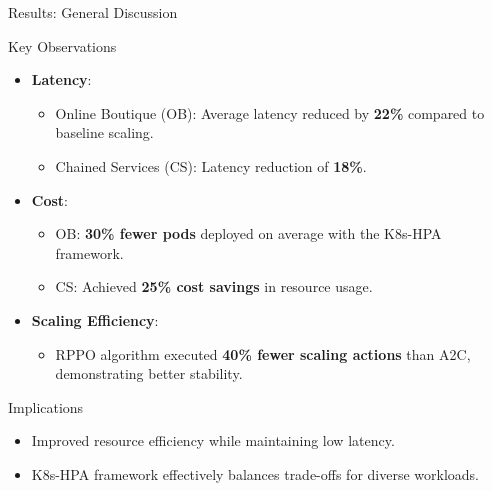 \documentclass{beamer}
\begin{document}
\begin{frame}{Results: General Discussion}
    \begin{block}{Key Observations}
        \begin{itemize}
            \item \textbf{Latency}:
            \begin{itemize}
                \item Online Boutique (OB): Average latency reduced by \textbf{22\%} compared to baseline scaling.
                \item Chained Services (CS): Latency reduction of \textbf{18\%}.
            \end{itemize}
            \item \textbf{Cost}:
            \begin{itemize}
                \item OB: \textbf{30\% fewer pods} deployed on average with the K8s-HPA framework.
                \item CS: Achieved \textbf{25\% cost savings} in resource usage.
            \end{itemize}
            \item \textbf{Scaling Efficiency}:
            \begin{itemize}
                \item RPPO algorithm executed \textbf{40\% fewer scaling actions} than A2C, demonstrating better stability.
            \end{itemize}
        \end{itemize}
    \end{block}
    \begin{block}{Implications}
        \begin{itemize}
            \item Improved resource efficiency while maintaining low latency.
            \item K8s-HPA framework effectively balances trade-offs for diverse workloads.
        \end{itemize}
    \end{block}
\end{frame}
\end{document}
